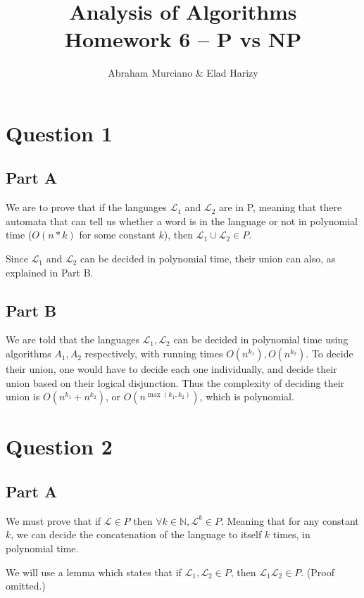 \documentclass{article}
\title{Analysis of Algorithms \\
\medskip
\large Homework 6 -- P vs NP}
\author{Abraham Murciano \& Elad Harizy}
\newcommand{\lang}{\mathcal{L}}
\begin{document}
\maketitle

\section*{Question 1}

\subsection*{Part A}

We are to prove that if the languages \(\lang_1\) and \(\lang_2\) are in P, meaning that there automata that can tell us whether a word is in the language or not in polynomial time (\(O(n*k)\) for some constant \(k\)), then \(\lang_1 \cup \lang_2 \in P\).

Since \(\lang_1\) and \(\lang_2\) can be decided in polynomial time, their union can also, as explained in Part B.

\subsection*{Part B}

We are told that the languages \(\lang_1, \lang_2\) can be decided in polynomial time using algorithms \(A_1, A_2\) respectively, with running times \(O(n^{k_1}), O(n^{k_2})\). To decide their union, one would have to decide each one individually, and decide their union based on their logical disjunction. Thus the complexity of deciding their union is \(O(n^{k_1} + n^{k_2})\), or \(O(n^{\max(k_1, k_2)})\), which is polynomial.

\section*{Question 2}

\subsection*{Part A}

We must prove that if \(\lang \in P\) then \(\forall k \in \mathbb{N}, \lang^k \in P\). Meaning that for any constant \(k\), we can decide the concatenation of the language to itself \(k\) times, in polynomial time.

We will use a lemma which states that if \(\lang_1, \lang_2 \in P\), then \(\lang_1\lang_2 \in P\). (Proof omitted.)
\end{document}
